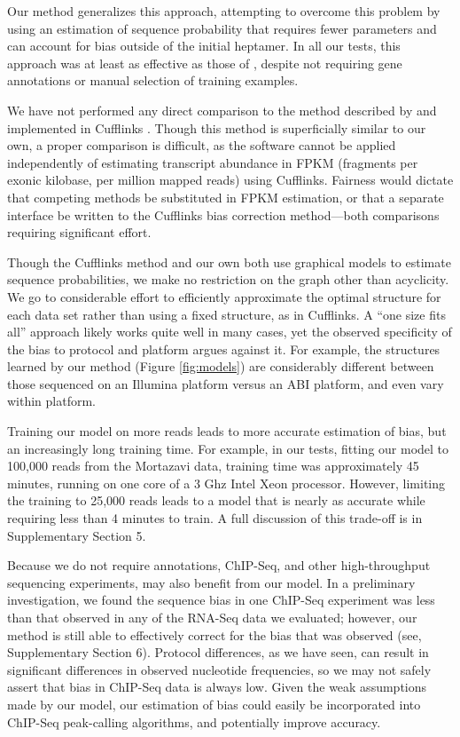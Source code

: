 \documentclass{bioinfo}
\begin{document}
Our method generalizes this approach, attempting to overcome this problem by
using an estimation of sequence probability that requires fewer parameters
and can account for bias outside of the initial heptamer. In all our tests, this
approach was at least as effective as those of \citet{Li2010}, despite not
requiring gene annotations or manual selection of training examples.

We have not performed any direct comparison to the method described by
\citet{Roberts2011} and implemented in Cufflinks \citep{Trapnell2010}. Though
this method is superficially similar to our own, a proper comparison is
difficult, as the software cannot be applied independently of estimating
transcript abundance in FPKM (fragments per exonic kilobase, per million mapped
reads) using Cufflinks. Fairness would dictate that competing methods be
substituted in FPKM estimation, or that a separate interface be written to the
Cufflinks bias correction method---both comparisons requiring significant effort.

Though the Cufflinks method and our own both use graphical models to estimate
sequence probabilities, we make no restriction on the graph other than
acyclicity. We go to considerable effort to efficiently approximate the optimal
structure for each data set rather than using a fixed structure, as in
Cufflinks. A ``one size fits all'' approach likely works quite well in many
cases, yet the observed specificity of the bias to protocol and platform argues
against it. For example, the structures learned by our method (Figure
\ref{fig:models}) are considerably different between those sequenced on an
Illumina platform versus an ABI platform, and even vary within platform.

Training our model on more reads leads to more accurate estimation of bias, but
an increasingly long training time. For example, in our tests, fitting our model to
100,000 reads from the Mortazavi data, training time was approximately 45
minutes, running on one core of a 3 Ghz Intel Xeon processor. However, limiting
the training to 25,000 reads leads to a model that is nearly as accurate while
requiring less than 4 minutes to train. A full discussion of this trade-off is in
Supplementary Section 5.

Because we do not require annotations, ChIP-Seq, and other high-throughput
sequencing experiments, may also benefit from our model. In a preliminary
investigation, we found the sequence bias in one ChIP-Seq experiment
\cite{Cao2010} was less than that observed in any of the RNA-Seq data we
evaluated; however, our method is still able to effectively correct for the bias
that was observed (see, Supplementary Section 6).  Protocol differences, as we
have seen, can result in significant differences in observed nucleotide
frequencies, so we may not safely assert that bias in ChIP-Seq data is always
low.  Given the weak assumptions made by our model, our estimation of bias could
easily be incorporated into ChIP-Seq peak-calling algorithms, and potentially
improve accuracy.
\end{document}
